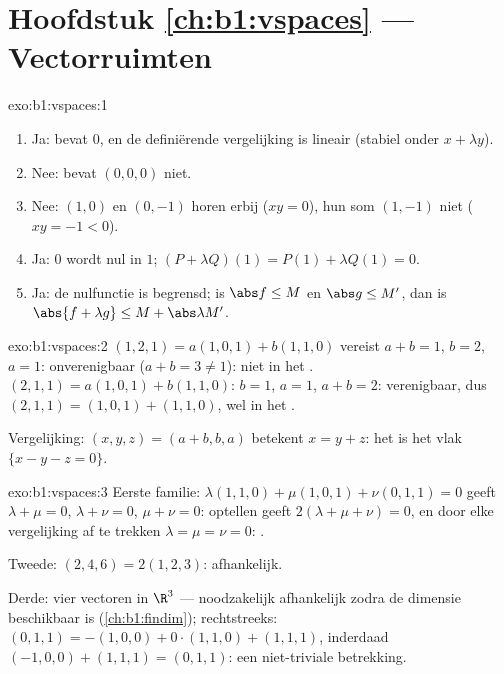 \section*{Hoofdstuk \ref{ch:b1:vspaces} --- Vectorruimten}

\begin{solution}{exo:b1:vspaces:1}
\begin{enumerate}
  \item Ja: bevat $0$, en de definiërende vergelijking is lineair
        (stabiel onder $x + \lambda y$).
  \item Nee: bevat $(0,0,0)$ niet.
  \item Nee: $(1, 0)$ en $(0, -1)$ horen erbij ($xy = 0$), hun som
        $(1, -1)$ niet ($xy = -1 < 0$).
  \item Ja: $0$ wordt nul in $1$; $(P + \lambda Q)(1) = P(1) +
        \lambda Q(1) = 0$.
  \item Ja: de nulfunctie is begrensd; is $\abs f \leq M$ en $\abs
        g \leq M'$, dan is $\abs{f + \lambda g} \leq M + \abs\lambda
        M'$.
\end{enumerate}
\end{solution}

\begin{solution}{exo:b1:vspaces:2}
$(1,2,1) = a(1,0,1) + b(1,1,0)$ vereist $a + b = 1$, $b = 2$, $a =
1$: onverenigbaar ($a + b = 3 \neq 1$): niet in het .
$(2,1,1) = a(1,0,1) + b(1,1,0)$: $b = 1$, $a = 1$, $a + b = 2$:
verenigbaar, dus $(2,1,1) = (1,0,1) + (1,1,0)$, wel in het
.

Vergelijking: $(x, y, z) = (a + b, b, a)$ betekent $x = y + z$: het
 is het vlak $\{x - y - z = 0\}$.
\end{solution}

\begin{solution}{exo:b1:vspaces:3}
Eerste familie: $\lambda(1,1,0) + \mu(1,0,1) + \nu(0,1,1) = 0$ geeft
$\lambda + \mu = 0$, $\lambda + \nu = 0$, $\mu + \nu = 0$: optellen
geeft $2(\lambda + \mu + \nu) = 0$, en door elke vergelijking af te
trekken $\lambda = \mu = \nu = 0$: .

Tweede: $(2,4,6) = 2(1,2,3)$: afhankelijk.

Derde: vier vectoren in $\R^3$ --- noodzakelijk afhankelijk zodra de
dimensie beschikbaar is (\cref{ch:b1:findim}); rechtstreeks:
$(0,1,1) = -(1,0,0) + 0\cdot(1,1,0) + (1,1,1)$, inderdaad $(-1,0,0)
+ (1,1,1) = (0,1,1)$: een niet-triviale betrekking.
\end{solution}

